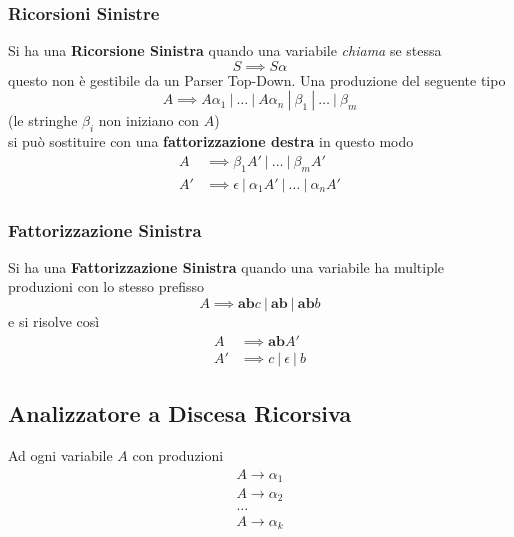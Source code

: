 \documentclass[12pt]{article}
\begin{document}
\subsubsection{Ricorsioni Sinistre}
Si ha una \textbf{Ricorsione Sinistra} quando una variabile \textit{chiama} se stessa 
\begin{equation*}
    S \implies S\alpha
\end{equation*}
questo non è gestibile da un Parser Top-Down. Una produzione del seguente tipo
\begin{equation*}
    A \implies A\alpha_1\ |\ \dots\ |\ A\alpha_n\ |\ \beta_1\ |\ \dots\ |\ \beta_m
\end{equation*}
(le stringhe $\beta_i$ non iniziano con $A$)\\
si può sostituire con una \textbf{fattorizzazione destra} in questo modo
\begin{equation*}
    \begin{aligned}
        A &\implies \beta_1A'\ |\ \dots\ |\ \beta_mA'\\        
        A' &\implies \epsilon\ |\ \alpha_1A'\ |\ \dots\ |\ \alpha_nA'
    \end{aligned}
\end{equation*}

\subsubsection{Fattorizzazione Sinistra}
Si ha una \textbf{Fattorizzazione Sinistra} quando una variabile ha multiple produzioni con lo stesso prefisso
\begin{equation*}
    A \implies \textbf{ab}c\ |\ \textbf{ab}\ |\ \textbf{ab}b
\end{equation*}
e si risolve così
\begin{equation*}
    \begin{aligned}
        A &\implies \textbf{ab}A'\\
        A' &\implies c\ |\ \epsilon\ |\ b
    \end{aligned}
\end{equation*}

\subsection{Analizzatore a Discesa Ricorsiva}
Ad ogni variabile $A$ con produzioni
\begin{equation*}
    \begin{aligned}
        A \rightarrow \alpha_1\\
        A \rightarrow \alpha_2\\
        \dots\\
        A \rightarrow \alpha_k
    \end{aligned}
\end{equation*}
\end{document}
